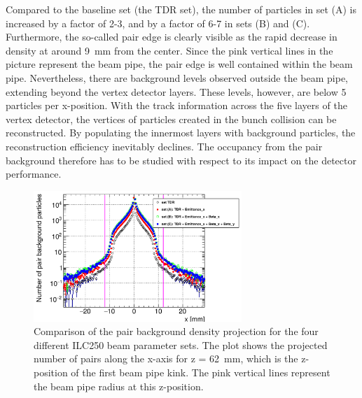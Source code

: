 Compared to the baseline set (the TDR set), the number of particles in set (A) is increased by a factor of 2-3, and by a factor of 6-7 in sets (B) and (C).
Furthermore, the so-called pair edge is clearly visible as the rapid decrease in density at around \SI{9}{\milli\meter} from the center.
Since the pink vertical lines in the picture represent the beam pipe, the pair edge is well contained within the beam pipe.
Nevertheless, there are background levels observed outside the beam pipe, extending beyond the vertex detector layers.
These levels, however, are below 5 particles per x-position.
With the track information across the five layers of the vertex detector, the vertices of particles created in the bunch collision can be reconstructed.
By populating the innermost layers with background particles, the reconstruction efficiency inevitably declines.
The occupancy from the pair background therefore has to be studied with respect to its impact on the detector performance.
\begin{figure}
    \centering
    \includegraphics[width=0.7\textwidth]{Figures/Pairs/HelixEnvelope_Projection_Comparison_250GeV_parametersets_LEG.png}
    \caption[Pair background density projection for different ILC250 beam parameter sets]{
    Comparison of the pair background density projection for the four different ILC250 beam parameter sets.
    The plot shows the projected number of pairs along the x-axis for z = \SI[detect-all]{62}{\milli\meter}, which is the z-position of the first beam pipe kink.
    The pink vertical lines represent the beam pipe radius at this z-position.
    }
    \label{fig:PairBkg:Density_Projection}
\end{figure}

